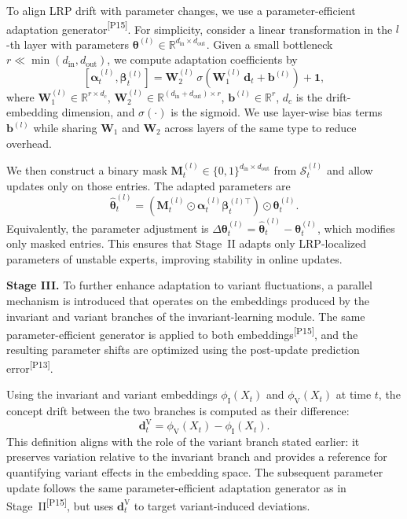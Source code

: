 ﻿\documentclass[journal]{IEEEtran}
\DeclareRobustCommand{\auditbad}[2]{{\color{auditred}#1}{\color{auditred}\textsuperscript{[#2]}}}
\begin{document}
To align LRP drift with parameter changes, we use a \auditbad{parameter-efficient adaptation generator}{P15}. For simplicity, consider a linear transformation in the $l$-th layer with parameters $\boldsymbol{\theta}^{(l)}\in\mathbb{R}^{d_{\mathrm{in}}\times d_{\mathrm{out}}}$. Given a small bottleneck $r\ll\min(d_{\mathrm{in}},d_{\mathrm{out}})$, we compute adaptation coefficients by
\begin{equation}
\left[{\boldsymbol{\alpha}}^{(l)}_t,{\boldsymbol{\beta}}^{(l)}_t\right]
=\mathbf{W}^{(l)}_2\,\sigma\!\left(\mathbf{W}^{(l)}_1\,\mathbf{d}_t+\mathbf{b}^{(l)}\right)+\mathbf{1},
\end{equation}
where $\mathbf{W}^{(l)}_1\in\mathbb{R}^{r\times d_c}$, $\mathbf{W}^{(l)}_2\in\mathbb{R}^{(d_{\mathrm{in}}+d_{\mathrm{out}})\times r}$, $\mathbf{b}^{(l)}\in\mathbb{R}^{r}$, $d_c$ is the drift-embedding dimension, and $\sigma(\cdot)$ is the sigmoid. We use layer-wise bias terms $\mathbf{b}^{(l)}$ while sharing $\mathbf{W}_1$ and $\mathbf{W}_2$ across layers of the same type to reduce overhead.

We then construct a binary mask $\mathbf{M}_t^{(l)}\in\{0,1\}^{d_{\mathrm{in}}\times d_{\mathrm{out}}}$ from $\mathcal{S}_t^{(l)}$ and allow updates only on those entries. The adapted parameters are
\begin{equation}
\widehat{\boldsymbol{\theta}}^{(l)}_t=\left(\mathbf{M}_t^{(l)}\odot {\boldsymbol{\alpha}}^{(l)}_t {\boldsymbol{\beta}}^{(l)\top}_t\right)\odot \boldsymbol{\theta}_t^{(l)}.
\end{equation}
Equivalently, the parameter adjustment is $\Delta\boldsymbol{\theta}^{(l)}_t=\widehat{\boldsymbol{\theta}}^{(l)}_t-\boldsymbol{\theta}_t^{(l)}$, which modifies only masked entries. This ensures that Stage~II adapts only LRP-localized parameters of unstable experts, improving stability in online updates. 

\textbf{Stage III.} To further enhance adaptation to variant fluctuations, a parallel mechanism is introduced that operates on the embeddings produced by the invariant and variant branches of the invariant-learning module. The same \auditbad{parameter-efficient generator is applied to both embeddings}{P15}, and the resulting parameter shifts are \auditbad{optimized using the post-update prediction error}{P13}.

Using the invariant and variant embeddings $\phi_{\mathrm{I}}(X_t)$ and $\phi_{\mathrm{V}}(X_t)$ at time $t$, the concept drift between the two branches is computed as their difference:
\begin{equation}
\mathbf{d}^{\mathrm{V}}_t=\phi_{\mathrm{V}}(X_t)-\phi_{\mathrm{I}}(X_t).
\end{equation}
This definition aligns with the role of the variant branch stated earlier: it preserves variation relative to the invariant branch and provides a reference for quantifying variant effects in the embedding space. The subsequent parameter update follows the same \auditbad{parameter-efficient adaptation generator as in Stage~II}{P15}, but uses $\mathbf{d}^{\mathrm{V}}_t$ to target variant-induced deviations.
\end{document}
